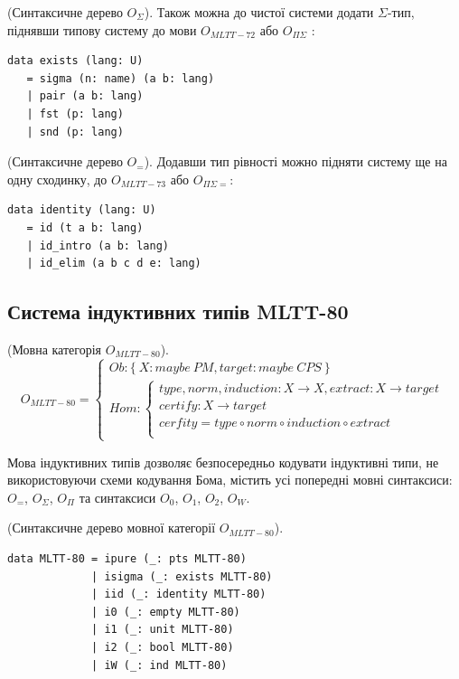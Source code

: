 \begin{definition} (Синтаксичне дерево $O_\Sigma$).
Також можна до чистої системи додати $\Sigma$-тип,
піднявши типову систему до мови $O_{MLTT-72}$ або $O_{\Pi\Sigma}$ :
\begin{lstlisting}[mathescape=true]
data exists (lang: U)
   = sigma (n: name) (a b: lang)
   | pair (a b: lang)
   | fst (p: lang)
   | snd (p: lang)
\end{lstlisting}
\end{definition}

\begin{definition} (Синтаксичне дерево $O_=$).
Додавши тип рівності можно підняти систему ще на одну сходинку,
до $O_{MLTT-73}$ або $O_{\Pi\Sigma=}$:
\begin{lstlisting}[mathescape=true]
data identity (lang: U)
   = id (t a b: lang)
   | id_intro (a b: lang)
   | id_elim (a b c d e: lang)
\end{lstlisting}
\end{definition}

\newpage
\subsection{Система індуктивних типів MLTT-80}

\begin{definition} (Мовна категорія $O_{MLTT-80}$).
\begin{equation}
O_{MLTT-80} =
\begin{cases}
Ob: \{\ X: maybe\ PM, target: maybe\ CPS\ \} \\
Hom: \begin{cases}
type,norm,induction: X \rightarrow X, extract: X \rightarrow target \\
certify : X \rightarrow target \\
cerfity = type \circ norm \circ induction \circ extract \\
\end{cases}
\end{cases}
\end{equation}
\end{definition}

Мова індуктивних типів дозволяє безпосередньо кодувати індуктивні типи,
не використовуючи схеми кодування Бома, містить усі попередні мовні синтаксиси:
$O_=$, $O_\Sigma$, $O_\Pi$ та синтаксиси $O_0$, $O_1$, $O_2$, $O_W$.

\begin{definition} (Синтаксичне дерево мовної категорії $O_{MLTT-80}$).
\begin{lstlisting}
data MLTT-80 = ipure (_: pts MLTT-80)
             | isigma (_: exists MLTT-80)
             | iid (_: identity MLTT-80)
             | i0 (_: empty MLTT-80)
             | i1 (_: unit MLTT-80)
             | i2 (_: bool MLTT-80)
             | iW (_: ind MLTT-80)
\end{lstlisting}
\end{definition}

